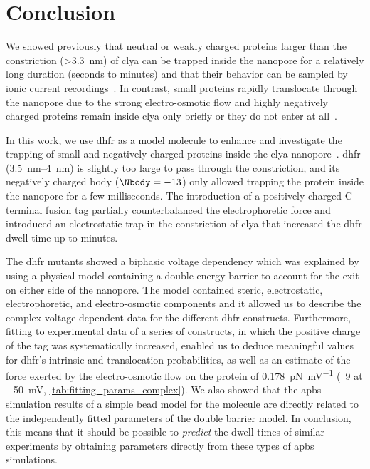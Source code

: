 %
\section{Conclusion}
%
\label{sec:trapping:conclusion}
%
We showed previously that neutral or weakly charged proteins larger than the \transi{} constriction
(\SI{>3.3}{\nm}) of \gls{clya} can be trapped inside the nanopore for a relatively long duration (seconds to
minutes) and that their behavior can be sampled by ionic current recordings~\cite{Soskine-2013,
Soskine-2012,Soskine-Biesemans-2015,Biesemans-2015,VanMeervelt-2014}. In contrast, small proteins rapidly
translocate through the nanopore due to the strong electro-osmotic flow and highly negatively charged proteins
remain inside \gls{clya} only briefly or they do not enter at all~\cite{Soskine-2012}.

In this work, we use \gls{dhfr} as a model molecule to enhance and investigate the trapping of small and
negatively charged proteins inside the \gls{clya} nanopore~\cite{Biesemans-2015}. \gls{dhfr}
(\SIrange{3.5}{4}{\nm}) is slightly too large to pass through the \transi{} constriction, and its negatively
charged body ($\Nbody = -13$) only allowed trapping the protein inside the nanopore for a few milliseconds.
The introduction of a positively charged C-terminal fusion tag partially counterbalanced the electrophoretic
force and introduced an electrostatic trap in the \transi{} constriction of \gls{clya} that increased the
\gls{dhfr} dwell time up to minutes.

The \gls{dhfr} mutants showed a biphasic voltage dependency which was explained by using a physical model
containing a double energy barrier to account for the exit on either side of the nanopore. The model contained
steric, electrostatic, electrophoretic, and electro-osmotic components and it allowed us to describe the
complex voltage-dependent data for the different \gls{dhfr} constructs. Furthermore, fitting to experimental
data of a series of  constructs, in which the positive charge of the tag was systematically
increased, enabled us to deduce meaningful values for \gls{dhfr}'s intrinsic \cisi{} and \transi{}
translocation probabilities, as well as an estimate of the force exerted by the electro-osmotic flow on the
protein of \SI{0.178}{\pico\newton\per\milli\volt} (\eg~\SI{9}{\pN} at \SI{-50}{\mV},
\cref{tab:fitting_params_complex}). We also showed that the \gls{apbs} simulation results of a simple bead
model for the molecule are directly related to the independently fitted parameters of the double barrier
model. In conclusion, this means that it should be possible to \emph{predict} the dwell times of similar
experiments by obtaining parameters directly from these types of \gls{apbs} simulations.

